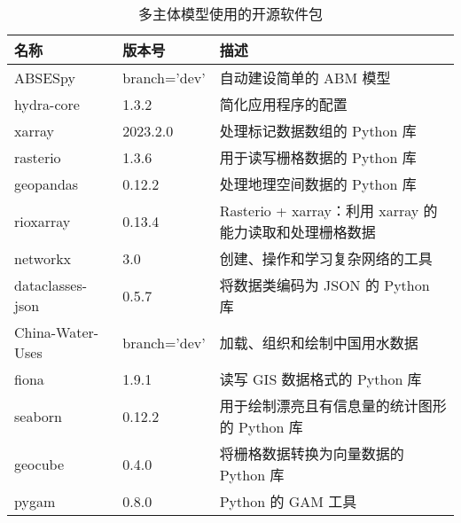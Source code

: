\begin{table}[htbp]
    \centering
    \caption{多主体模型使用的开源软件包}
      \begin{tabularx}{0.8\textwidth}{p{1.5cm} p{1.5cm} L}
        \toprule
      名称    & 版本号   & 描述 \\
      \midrule
      ABSESpy & branch='dev' & 自动建设简单的 ABM 模型 \\
      hydra-core & 1.3.2 & 简化应用程序的配置 \\
      xarray & 2023.2.0 & 处理标记数据数组的 Python 库 \\
      rasterio & 1.3.6 & 用于读写栅格数据的 Python 库 \\
      geopandas & 0.12.2 & 处理地理空间数据的 Python 库 \\
      rioxarray & 0.13.4 & Rasterio + xarray：利用 xarray 的能力读取和处理栅格数据 \\
      networkx & 3.0 & 创建、操作和学习复杂网络的工具 \\
      dataclasses-json & 0.5.7 & 将数据类编码为 JSON 的 Python 库 \\
      China-Water-Uses & branch='dev' & 加载、组织和绘制中国用水数据 \\
      fiona & 1.9.1 & 读写 GIS 数据格式的 Python 库 \\
      seaborn & 0.12.2 & 用于绘制漂亮且有信息量的统计图形的 Python 库 \\
      geocube & 0.4.0 & 将栅格数据转换为向量数据的 Python 库 \\
      pygam & 0.8.0 & Python 的 GAM 工具 \\
      \bottomrule
      \end{tabularx}%
    \label{ch6:tab:packages}%
  \end{table}%
  